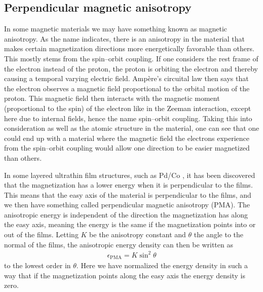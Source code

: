 \subsection{Perpendicular magnetic anisotropy} \label{sec:PMA}
In some magnetic materials we may have something known as magnetic anisotropy. As the name indicates, there is an anisotropy in the material that makes certain magnetization directions more energetically favorable than others. This mostly stems from the spin--orbit coupling. If one considers the rest frame of the electron instead of the proton, the proton is orbiting the electron and thereby causing a temporal varying electric field. Amp\`{e}re's circuital law then says that the electron observes a magnetic field proportional to the orbital motion of the proton. This magnetic field then interacts with the magnetic moment (proportional to the spin) of the electron like in the Zeeman interaction, except here due to internal fields, hence the name spin--orbit coupling. Taking this into consideration as well as the atomic structure in the material, one can see that one could end up with a material where the magnetic field the electrons experience from the spin--orbit coupling would allow one direction to be easier magnetized than others.

In some layered ultrathin film structures, such as Pd/Co \cite{Carcia1985}, it has been discovered that the magnetization has a lower energy when it is perpendicular to the films. This means that the easy axis of the material is perpendicular to the films, and we then have something called perpendicular magnetic anisotropy (PMA). The anisotropic energy is independent of the direction the magnetization has along the easy axis, meaning the energy is the same if the magnetization points into or out of the films. Letting $K$ be the anisotropy constant and $\theta$ the angle to the normal of the films, the anisotropic energy density can then be written as
\begin{align}
\epsilon_{\text{PMA}} = K\sin^2\theta \label{eq:PMADensity}
\end{align} 
to the lowest order in $\theta$. Here we have normalized the energy density in such a way that if the magnetization points along the easy axis the energy density is zero.

